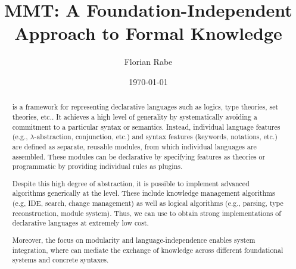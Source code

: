 \documentclass[12pt]{article}
\begin{document}
\author{Florian Rabe}
\title{MMT: A Foundation-Independent Approach to Formal Knowledge}
\date{\today}
\maketitle

\begin{abstract}
\mmt is a framework for representing declarative languages such as logics, type theories, set theories, etc..
It achieves a high level of generality by systematically avoiding a commitment to a particular syntax or semantics.
Instead, individual language features (e.g., $\lambda$-abstraction, conjunction, etc.) and syntax features (keywords, notations, etc.) are defined as separate, reusable modules, from which individual languages are assembled.
These modules can be declarative by specifying features as \mmt theories or programmatic by providing individual rules as plugins.

Despite this high degree of abstraction, it is possible to implement advanced algorithms generically at the \mmt level.
These include knowledge management algorithms (e.g, IDE, search, change management) as well as logical algorithms (e.g., parsing, type reconstruction, module system).
Thus, we can use \mmt to obtain strong implementations of declarative languages at extremely low cost.

Moreover, the focus on modularity and language-independence enables system integration, where \mmt can mediate the exchange of knowledge across different foundational systems and concrete syntaxes.
\end{abstract}





\end{document}
